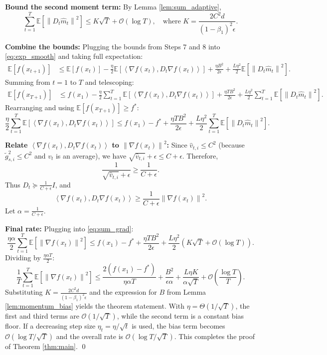 \documentclass{article}
\newcommand{\E}{\mathbb{E}}
\newcommand{\norm}[1]{\left\| #1 \right\|}
\newcommand{\inner}[2]{\left\langle #1, #2 \right\rangle}
\newcommand{\step}[1]{\text{[Step #1]}}
\begin{document}
\step{8} \textbf{Bound the second moment term:} By Lemma \ref{lem:sum_adaptive},
\[
    \sum_{t=1}^T \E[\norm{D_t \hat{m}_t}^2] \le K \sqrt{T} + \mathcal{O}(\log T), \quad \text{where } K = \frac{2 C^2 d}{(1-\beta_1)^2 \epsilon}.
\]

\step{9} \textbf{Combine the bounds:} Plugging the bounds from Steps 7 and 8 into \eqref{eq:exp_smooth} and taking full expectation:
\begin{align}
    \E[f(x_{t+1})] &\le \E[f(x_t)] - \frac{\eta}{2} \E[\inner{\nabla f(x_t)}{D_t \nabla f(x_t)}] + \frac{\eta B^2}{2\epsilon} + \frac{L \eta^2}{2} \E[\norm{D_t \hat{m}_t}^2].
\end{align}
Summing from $t=1$ to $T$ and telescoping:
\begin{align}
    \E[f(x_{T+1})] &\le f(x_1) - \frac{\eta}{2} \sum_{t=1}^T \E[\inner{\nabla f(x_t)}{D_t \nabla f(x_t)}] + \frac{\eta T B^2}{2\epsilon} + \frac{L \eta^2}{2} \sum_{t=1}^T \E[\norm{D_t \hat{m}_t}^2].
\end{align}
Rearranging and using $\E[f(x_{T+1})] \ge f^*$:
\begin{equation} \label{eq:sum_grad}
    \frac{\eta}{2} \sum_{t=1}^T \E[\inner{\nabla f(x_t)}{D_t \nabla f(x_t)}] \le f(x_1) - f^* + \frac{\eta T B^2}{2\epsilon} + \frac{L \eta^2}{2} \sum_{t=1}^T \E[\norm{D_t \hat{m}_t}^2].
\end{equation}

\step{10} \textbf{Relate $\inner{\nabla f(x_t)}{D_t \nabla f(x_t)}$ to $\norm{\nabla f(x_t)}^2$:} Since $\hat{v}_{t,i} \le C^2$ (because $\tilde{g}_{s,i}^2 \le C^2$ and $v_t$ is an average), we have $\sqrt{\hat{v}_{t,i}} + \epsilon \le C + \epsilon$. Therefore,
\[
    \frac{1}{\sqrt{\hat{v}_{t,i}} + \epsilon} \ge \frac{1}{C + \epsilon}.
\]
Thus $D_t \succeq \frac{1}{C+\epsilon} I$, and
\[
    \inner{\nabla f(x_t)}{D_t \nabla f(x_t)} \ge \frac{1}{C+\epsilon} \norm{\nabla f(x_t)}^2.
\]
Let $\alpha = \frac{1}{C+\epsilon}$.

\step{11} \textbf{Final rate:} Plugging into \eqref{eq:sum_grad}:
\[
    \frac{\eta \alpha}{2} \sum_{t=1}^T \E[\norm{\nabla f(x_t)}^2] \le f(x_1) - f^* + \frac{\eta T B^2}{2\epsilon} + \frac{L \eta^2}{2} (K \sqrt{T} + \mathcal{O}(\log T)).
\]
Dividing by $\frac{\eta \alpha T}{2}$:
\[
    \frac{1}{T} \sum_{t=1}^T \E[\norm{\nabla f(x_t)}^2] \le \frac{2(f(x_1)-f^*)}{\eta \alpha T} + \frac{B^2}{\epsilon \alpha} + \frac{L \eta K}{\alpha \sqrt{T}} + \mathcal{O}\left(\frac{\log T}{T}\right).
\]
Substituting $K = \frac{2 C^2 d}{(1-\beta_1)^2 \epsilon}$ and the expression for $B$ from Lemma \ref{lem:momentum_bias} yields the theorem statement. With $\eta = \Theta(1/\sqrt{T})$, the first and third terms are $\mathcal{O}(1/\sqrt{T})$, while the second term is a constant bias floor. If a decreasing step size $\eta_t = \eta/\sqrt{t}$ is used, the bias term becomes $\mathcal{O}(\log T/\sqrt{T})$ and the overall rate is $\mathcal{O}(\log T/\sqrt{T})$. This completes the proof of Theorem \ref{thm:main}. \qed
\end{document}

